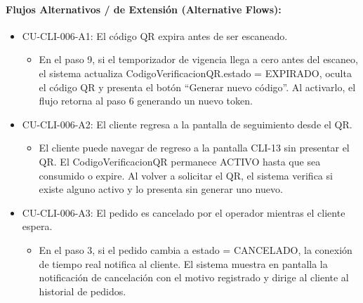 \paragraph{Flujos Alternativos / de Extensión (Alternative Flows):}
\begin{itemize}
    \item CU-CLI-006-A1: El código QR expira antes de ser escaneado.
    \begin{itemize}
        \item En el paso 9, si el temporizador de vigencia llega a cero antes del escaneo, el sistema actualiza CodigoVerificacionQR.estado = EXPIRADO, oculta el código QR y presenta el botón ``Generar nuevo código''. Al activarlo, el flujo retorna al paso 6 generando un nuevo token.
    \end{itemize}
    \item CU-CLI-006-A2: El cliente regresa a la pantalla de seguimiento desde el QR.
    \begin{itemize}
        \item El cliente puede navegar de regreso a la pantalla CLI-13 sin presentar el QR. El CodigoVerificacionQR permanece ACTIVO hasta que sea consumido o expire. Al volver a solicitar el QR, el sistema verifica si existe alguno activo y lo presenta sin generar uno nuevo.
    \end{itemize}
    \item CU-CLI-006-A3: El pedido es cancelado por el operador mientras el cliente espera.
    \begin{itemize}
        \item En el paso 3, si el pedido cambia a estado = CANCELADO, la conexión de tiempo real notifica al cliente. El sistema muestra en pantalla la notificación de cancelación con el motivo registrado y dirige al cliente al historial de pedidos.
    \end{itemize}
\end{itemize}


